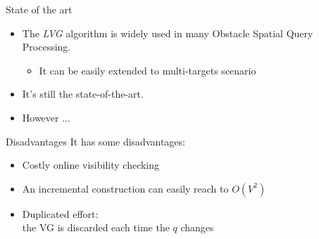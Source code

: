 \begin{frame}{State of the art}
\begin{itemize}
    \item \small{The \textit{LVG} algorithm is widely used in many Obstacle Spatial Query Processing.}
        \begin{itemize}
            \item \small It can be easily extended to multi-targets scenario
        \end{itemize}
    \item \small It's still the state-of-the-art.
    \item \small However ...
\end{itemize}
\end{frame}

\begin{frame}{Disadvantages}
It has some disadvantages:
\begin{itemize}
    \item \small Costly online visibility checking
    \item \small {An incremental construction can easily reach to $O(V^2)$}
    \item \small {Duplicated effort:\\
    the VG is discarded each time the $q$ changes}
\end{itemize}
\end{frame}
